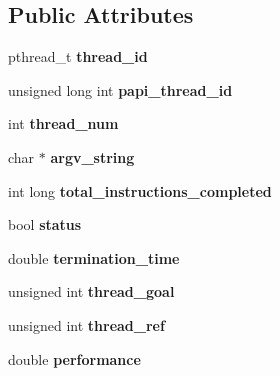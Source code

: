 \subsection*{Public Attributes}
\begin{DoxyCompactItemize}
\item 
\hypertarget{structthread__info_ae8018a1d675e2dca8d6ec8ba205af7ff}{pthread\-\_\-t {\bfseries thread\-\_\-id}}\label{structthread__info_ae8018a1d675e2dca8d6ec8ba205af7ff}

\item 
\hypertarget{structthread__info_ab4cb14de5a97fedf647c91bd0acda6fb}{unsigned long int {\bfseries papi\-\_\-thread\-\_\-id}}\label{structthread__info_ab4cb14de5a97fedf647c91bd0acda6fb}

\item 
\hypertarget{structthread__info_acd82f656186d4f5e847d3ae508b25c52}{int {\bfseries thread\-\_\-num}}\label{structthread__info_acd82f656186d4f5e847d3ae508b25c52}

\item 
\hypertarget{structthread__info_aab44fa1a78be237c6c4520b019815b30}{char $\ast$ {\bfseries argv\-\_\-string}}\label{structthread__info_aab44fa1a78be237c6c4520b019815b30}

\item 
\hypertarget{structthread__info_ab7cdfad7df7c94e519fd20e1b1899197}{int long {\bfseries total\-\_\-instructions\-\_\-completed}}\label{structthread__info_ab7cdfad7df7c94e519fd20e1b1899197}

\item 
\hypertarget{structthread__info_a3dec8aece8595c49d7f9ec2a5295c250}{bool {\bfseries status}}\label{structthread__info_a3dec8aece8595c49d7f9ec2a5295c250}

\item 
\hypertarget{structthread__info_abd3ae9ce0161694c02f11f14048432e5}{double {\bfseries termination\-\_\-time}}\label{structthread__info_abd3ae9ce0161694c02f11f14048432e5}

\item 
\hypertarget{structthread__info_a838569282a9bae961e15e19d77d6ea89}{unsigned int {\bfseries thread\-\_\-goal}}\label{structthread__info_a838569282a9bae961e15e19d77d6ea89}

\item 
\hypertarget{structthread__info_a3097e800f8a0b562588f30cde6d402f8}{unsigned int {\bfseries thread\-\_\-ref}}\label{structthread__info_a3097e800f8a0b562588f30cde6d402f8}

\item 
\hypertarget{structthread__info_a550e5d979288ef4eb6eab337d2f71b8e}{double {\bfseries performance}}\label{structthread__info_a550e5d979288ef4eb6eab337d2f71b8e}


\end{DoxyCompactItemize}

